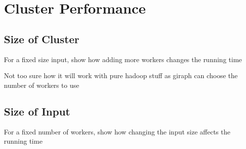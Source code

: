 \section{Cluster Performance}

\subsection{Size of Cluster}
For a fixed size input, show how adding more workers changes the running time

Not too sure how it will work with pure hadoop stuff as giraph can choose the number of workers to use

\subsection{Size of Input}
For a fixed number of workers, show how changing the input size affects the running time